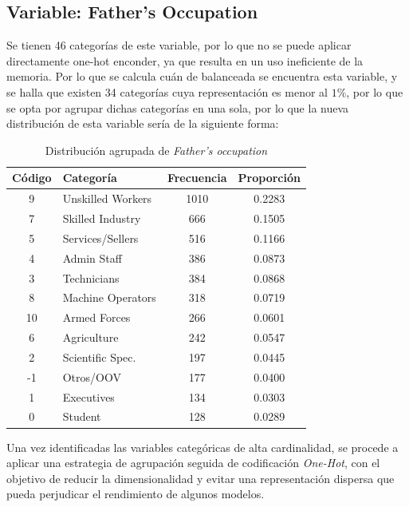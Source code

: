 \documentclass{report}[14pt]
\begin{document}
\subsection*{Variable: Father's Occupation}
Se tienen 46 categorías de este variable, por lo que no se puede aplicar directamente one-hot enconder, ya que resulta en un uso ineficiente de la memoria. Por lo que se calcula cuán de balanceada se encuentra esta variable, y se halla que existen 34 categorías cuya representación es menor al $1\%$, por lo que se opta por agrupar dichas categorías en una sola, por lo que la nueva distribución de esta variable sería de la siguiente forma:
\begin{table}[H]
    \centering
    \begin{tabular}{|c|l|c|c|}
        \hline
        \textbf{Código} & \textbf{Categoría} & \textbf{Frecuencia} & \textbf{Proporción} \\
        \hline
        9  & Unskilled Workers & 1010 & 0.2283 \\
        7  & Skilled Industry  & 666  & 0.1505 \\
        5  & Services/Sellers  & 516  & 0.1166 \\
        4  & Admin Staff       & 386  & 0.0873 \\
        3  & Technicians       & 384  & 0.0868 \\
        8  & Machine Operators & 318  & 0.0719 \\
        10 & Armed Forces      & 266  & 0.0601 \\
        6  & Agriculture       & 242  & 0.0547 \\
        2  & Scientific Spec.  & 197  & 0.0445 \\
        -1 & Otros/OOV         & 177  & 0.0400 \\
        1  & Executives        & 134  & 0.0303 \\
        0  & Student           & 128  & 0.0289 \\
        \hline
    \end{tabular}
    \caption{Distribución agrupada de \textit{Father's occupation}}
    \label{tab:father_occ}
\end{table}
Una vez identificadas las variables categóricas de alta cardinalidad, se procede a aplicar una estrategia de agrupación seguida de codificación \textit{One-Hot}, con el objetivo de reducir la dimensionalidad y evitar una representación dispersa que pueda perjudicar el rendimiento de algunos modelos.
\\
\end{document}
